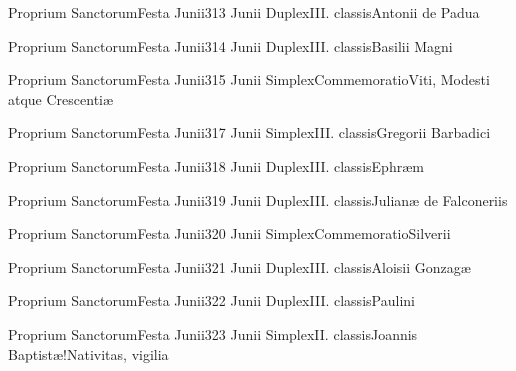 \documentclass[psalterium-feriale.tex]{subfiles}
\begin{document}
	{Proprium Sanctorum}{Festa Junii}{3}{13 Junii}
	{Duplex}{III. classis}{Antonii de Padua}
	{}
	{}

	{Proprium Sanctorum}{Festa Junii}{3}{14 Junii}
	{Duplex}{III. classis}{Basilii Magni}
	{}
	{}

	{Proprium Sanctorum}{Festa Junii}{3}{15 Junii}
	{Simplex}{Commemoratio}{Viti, Modesti atque Crescentiæ\linebreak\null}
	{}
	{}

	{Proprium Sanctorum}{Festa Junii}{3}{17 Junii}
	{Simplex}{III. classis}{Gregorii Barbadici}
	{}
	{}

	{Proprium Sanctorum}{Festa Junii}{3}{18 Junii}
	{Duplex}{III. classis}{Ephræm}
	{}
	{}

	{Proprium Sanctorum}{Festa Junii}{3}{19 Junii}
	{Duplex}{III. classis}{Julianæ de Falconeriis}
	{}
	{}

	{Proprium Sanctorum}{Festa Junii}{3}{20 Junii}
	{Simplex}{Commemoratio}{Silverii}
	{}
	{}

	{Proprium Sanctorum}{Festa Junii}{3}{21 Junii}
	{Duplex}{III. classis}{Aloisii Gonzagæ}
	{}
	{}

	{Proprium Sanctorum}{Festa Junii}{3}{22 Junii}
	{Duplex}{III. classis}{Paulini}
	{}
	{}

	{Proprium Sanctorum}{Festa Junii}{3}{23 Junii}
	{Simplex}{II. classis}{Joannis Baptistæ!Nativitas, vigilia}
	{}
	{}
\invitferia
\end{document}
